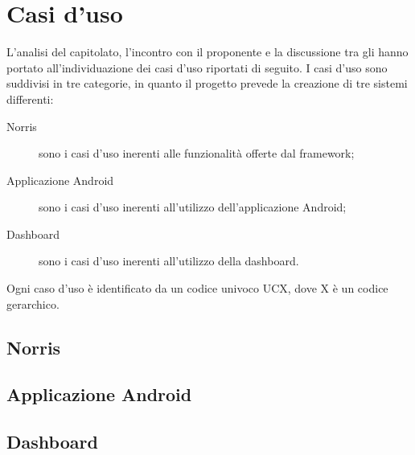 \section{Casi d'uso}
L’analisi del capitolato, l’incontro con il proponente e la discussione tra gli  hanno portato all'individuazione dei casi d'uso riportati di seguito. 
I casi d'uso sono suddivisi in tre categorie, in quanto il progetto prevede la creazione di tre sistemi differenti:
\begin{description}
	\item[Norris] sono i casi d'uso inerenti alle funzionalità offerte dal framework;
	\item[Applicazione Android] sono i casi d'uso inerenti all'utilizzo dell'applicazione Android;
	\item[Dashboard] sono i casi d'uso inerenti all'utilizzo della dashboard.
\end{description}
Ogni caso d'uso è identificato da un codice univoco UCX, dove X è un codice gerarchico.
\subsection{Norris}


\subsection{Applicazione Android}


\subsection{Dashboard}

